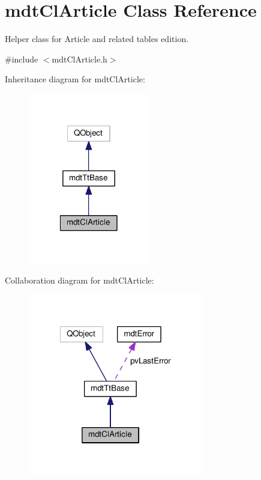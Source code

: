 \hypertarget{classmdt_cl_article}{\section{mdt\-Cl\-Article Class Reference}
\label{classmdt_cl_article}
}


Helper class for Article and related tables edition.  




{\ttfamily \#include $<$mdt\-Cl\-Article.\-h$>$}



Inheritance diagram for mdt\-Cl\-Article\-:
\nopagebreak
\begin{figure}[H]
\begin{center}
\leavevmode
\includegraphics[width=150pt]{classmdt_cl_article__inherit__graph}
\end{center}
\end{figure}


Collaboration diagram for mdt\-Cl\-Article\-:
\nopagebreak
\begin{figure}[H]
\begin{center}
\leavevmode
\includegraphics[width=218pt]{classmdt_cl_article__coll__graph}
\end{center}
\end{figure}
